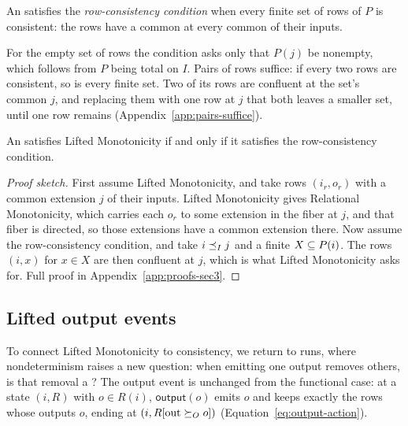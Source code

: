 \begin{definition}
\label{def:common-expansion-condition}
An \spectype satisfies the \emph{row-consistency condition} when every finite set of rows of $P$ is consistent: the rows have a common \outnoun at every common \indesc of their inputs.
\end{definition}

For the empty set of rows the condition asks only that $P(j)$ be nonempty, which
follows from $P$ being total on $I$.  Pairs of rows suffice: if every two rows are consistent, so is every finite
set.  Two of its rows are confluent at the set's common \indesc $j$, and
replacing them with one row at $j$ that \outrel both leaves a smaller set,
until one row remains
(Appendix~\ref{app:pairs-suffice}).

\begin{proposition}
\label{prop:common-expansion-form}
An \spectype satisfies Lifted Monotonicity if and only
if it satisfies the row-consistency condition.
\end{proposition}

\begin{proof}[Proof sketch]
First assume Lifted Monotonicity, and take rows $(i_r,o_r)$ with a common extension $j$ of their inputs.  Lifted Monotonicity gives Relational Monotonicity, which carries each $o_r$ to some extension in the fiber at $j$, and that fiber is directed, so those extensions have a common extension there.  Now assume the row-consistency
condition, and take $i\preceq_I j$ and a finite $X\subseteq P(i)$.  The
rows $(i,x)$ for $x\in X$ are then confluent at $j$, which is what Lifted Monotonicity asks for.  Full proof in
Appendix~\ref{app:proofs-sec3}.
\end{proof}

\subsection{Lifted output events}
\label{sec:lifted-output-events}

To connect Lifted Monotonicity to consistency, we return to runs, where
nondeterminism raises a new question: when emitting one output removes others,
is that removal a \commitment?  The output event is unchanged from the
functional case: at a state $(i,R)$ with $o\in R(i)$, $\mathsf{output}(o)$ emits
$o$ and keeps exactly the rows whose outputs \outrelbase $o$, ending at
$(i,R[\mathrm{out}\succeq_O o])$ (Equation~\ref{eq:output-action}).

